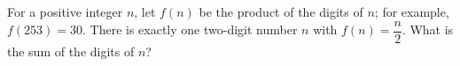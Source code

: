 For a positive integer $n$, let $f(n)$ be the product of the digits of $n$; for example, $f(253)=30$. There is exactly one two-digit number $n$ with $f(n)=\dfrac n2$. What is the sum of the digits of $n$?
